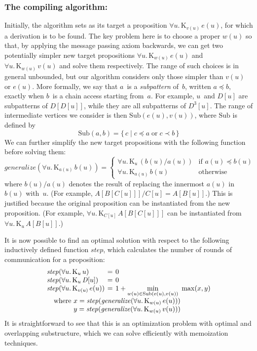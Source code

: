\documentclass{sokendai_thesis} %
\newcommand{\knows}[2]{\mathrm K_{#1}\,{#2}}
\begin{document}
\subsubsection{The compiling algorithm:}
Initially, the algorithm sets as its target a proposition $\forall u.\,\knows{v(u)}{e(u)}$, for which a derivation is to be found.
The key problem here is to choose a proper $w(u)$ so that, by applying the message passing axiom backwards, we can get two potentially simpler new target propositions $\forall u.\,\knows{w(u)}{e(u)}$ and $\forall u.\,\knows{w(u)}{v(u)}$ and solve them respectively.
The range of such choices is in general unbounded, but our algorithm considers only those simpler than $v(u)$ or $e(u)$.
More formally, we say that $a$~is a \emph{subpattern} of~$b$, written $a \preceq b$, exactly when $b$~is a chain access starting from~$a$.
For example, $u$~and $D[u]$ are subpatterns of $D[D[u]]$, while they are all subpatterns of $D^3[u]$.
The range of intermediate vertices we consider is then $\mathrm{Sub}(e(u), v(u))$, where $\mathrm{Sub}$ is defined by
\[ \mathrm{Sub}(a, b) = \{\,c \mid c \preceq a \mathrel\text{or} c \prec b \,\} \]
We can further simplify the new target propositions with the following function before solving them:
\[
\mathit{generalize}(\forall u.\,\knows{a(u)}{b(u)}) =
\begin{cases}
\forall u.\,\knows{u}{(b(u)/a(u))} & \text{if~} a(u) \preceq b(u) \\
\forall u.\,\knows{a(u)}{b(u)} & \text{otherwise}
\end{cases}
\]
where $b(u)/a(u)$ denotes the result of replacing the innermost $a(u)$ in $b(u)$ with~$u$.
(For example, $A[B[C[u]]]/C[u] = A[B[u]]$.)
This is justified because the original proposition can be instantiated from the new proposition.
(For example, $\forall u.\,\knows{C[u]}{A[B[C[u]]]}$ can be instantiated from $\forall u.\,\knows{u}{A[B[u]]}$.)

It is now possible to find an optimal solution with respect to the following inductively defined function $\mathit{step}$, which calculates the number of rounds of communication for a proposition:
\[ \setlength{\arraycolsep}{.2em}\begin{array}{lcl}
\mathit{step}(\forall u.\,\knows{u}{u}) &=& 0 \\
\mathit{step}(\forall u.\,\knows{u}{\mathit{D}[u]}) &=& 0 \\
\mathit{step}(\forall u.\,\knows{v(u)}{e(u)}) &=& \displaystyle 1+ \min_{w(u)\in \mathrm{Sub}(e(u),v(u))}~\max(x, y) \\
\multicolumn{3}{l}{\quad\text{where}~x = \mathit{step}(\mathit{generalize}(\forall u.\,\knows{w(u)}{e(u)}))} \\
\multicolumn{3}{l}{\quad\phantom{\text{where}}~y = \mathit{step}(\mathit{generalize}(\forall u.\,\knows{w(u)}{v(u)}))}
\end{array} \]
It is straightforward to see that this is an optimization problem with optimal and overlapping substructure, which we can solve efficiently with memoization techniques.
\end{document}
